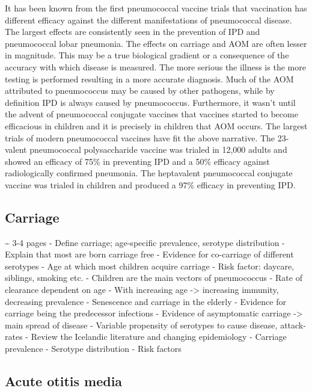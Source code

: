 \documentclass[]{book}
\theoremstyle{definition}
\theoremstyle{definition}
\theoremstyle{definition}
\theoremstyle{remark}
\begin{document}
It has been known from the first pneumococcal vaccine trials that
vaccination has different efficacy against the different manifestations
of pneumococcal disease. The largest effects are consistently seen in
the prevention of IPD and pneumococcal lobar pneumonia. The effects on
carriage and AOM are often lesser in magnitude. This may be a true
biological gradient or a consequence of the accuracy with which disease
is measured. The more serious the illness is the more testing is
performed resulting in a more accurate diagnosis. Much of the AOM
attributed to pneumococcus may be caused by other pathogens, while by
definition IPD is always caused by pneumococcus. Furthermore, it wasn't
until the advent of pneumococcal conjugate vaccines that vaccines
started to become efficacious in children and it is precisely in
children that AOM occurs. The largest trials of modern pneumococcal
vaccines have fit the above narrative. The 23-valent pneumococcal
polysaccharide vaccine was trialed in 12,000 adults and showed an
efficacy of 75\% in preventing IPD and a 50\% efficacy against
radiologically confirmed pneumonia. The heptavalent pneumococcal
conjugate vaccine was trialed in children and produced a 97\% efficacy
in preventing IPD.

\subsection{Carriage}\label{carriage}

\textasciitilde{} 3-4 pages - Define carriage; age-specific prevalence,
serotype distribution - Explain that most are born carriage free -
Evidence for co-carriage of different serotypes - Age at which most
children acquire carriage - Risk factor: daycare, siblings, smoking etc.
- Children are the main vectors of pneumococcus - Rate of clearance
dependent on age - With increasing age -\textgreater{} increasing
immunity, decreasing prevalence - Senescence and carriage in the elderly
- Evidence for carriage being the predecessor infections - Evidence of
asymptomatic carriage -\textgreater{} main spread of disease - Variable
propensity of serotypes to cause disease, attack-rates - Review the
Icelandic literature and changing epidemiology - Carriage prevalence -
Serotype distribution - Risk factors

\subsection{Acute otitis media}\label{acute-otitis-media}
\end{document}
